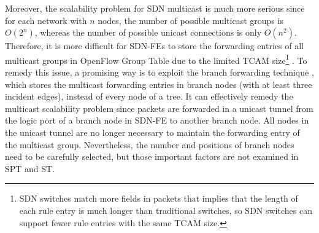 \documentclass[10pt, conference, letterpaper]{IEEEtran}
\theoremstyle{definition}
\begin{document}
Moreover, the scalability problem for SDN multicast is much more serious since for each network with $n$ nodes, the number of possible multicast groups is $O(2^n)$, whereas the number of possible unicast connections is only $O(n^2)$. Therefore, it is more difficult for SDN-FEs to store the forwarding entries of all multicast groups in OpenFlow Group Table due to the limited TCAM size\footnote{{\color{black}SDN switches match more fields in packets that implies that the length of each rule entry is much longer than traditional switches, so SDN switches can support fewer rule entries with the same TCAM size.}}  \cite{DIFANE,multicastTEforSDN}. To remedy this issue, a promising way is to exploit the branch forwarding technique \cite{UnicastTunnelForMulticast,UnicastTunnelForMulticast2,UnicastTunnelForMulticast3}, which stores the multicast forwarding entries in branch nodes (with at least three incident edges), instead of every node of a tree. It can effectively remedy the multicast scalability problem since packets are forwarded in a unicast tunnel from the logic port of a branch node in SDN-FE \cite{OpenFlow} to another branch node. All nodes in the unicast tunnel are no longer necessary to maintain the forwarding entry of the multicast group. Nevertheless, the number and positions of branch nodes need to be carefully selected, but those important factors are not examined in SPT and ST.
\end{document}
